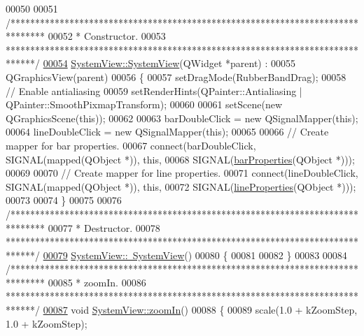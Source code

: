 \begin{DoxyCode}
00050 
00051 \textcolor{comment}{/*******************************************************************************}
00052 \textcolor{comment}{ * Constructor.}
00053 \textcolor{comment}{ ******************************************************************************/}
\hypertarget{systemview_8cpp_source_l00054}{}\hyperlink{group___graphics_ga660a455ff7b98cb92410b0bf1cbb2eeb}{00054} \hyperlink{group___graphics_ga660a455ff7b98cb92410b0bf1cbb2eeb}{SystemView::SystemView}(QWidget *parent) :
00055   QGraphicsView(parent)
00056 \{
00057   setDragMode(RubberBandDrag);
00058   \textcolor{comment}{// Enable antialiasing}
00059   setRenderHints(QPainter::Antialiasing | QPainter::SmoothPixmapTransform);
00060 
00061   setScene(\textcolor{keyword}{new} QGraphicsScene(\textcolor{keyword}{this}));
00062 
00063   barDoubleClick = \textcolor{keyword}{new} QSignalMapper(\textcolor{keyword}{this});
00064   lineDoubleClick = \textcolor{keyword}{new} QSignalMapper(\textcolor{keyword}{this});
00065 
00066   \textcolor{comment}{// Create mapper for bar properties.}
00067   connect(barDoubleClick, SIGNAL(mapped(QObject *)), \textcolor{keyword}{this},
00068           SIGNAL(\hyperlink{class_system_view_a90bd4b070c8abaa5995899154421eb44}{barProperties}(QObject *)));
00069 
00070   \textcolor{comment}{// Create mapper for line properties.}
00071   connect(lineDoubleClick, SIGNAL(mapped(QObject *)), \textcolor{keyword}{this},
00072           SIGNAL(\hyperlink{class_system_view_a58c4a0bf68178ab59066819118214360}{lineProperties}(QObject *)));
00073 
00074 \}
00075 
00076 \textcolor{comment}{/*******************************************************************************}
00077 \textcolor{comment}{ * Destructor.}
00078 \textcolor{comment}{ ******************************************************************************/}
\hypertarget{systemview_8cpp_source_l00079}{}\hyperlink{group___graphics_ga0091352981c1efa5498819b69698db44}{00079} \hyperlink{group___graphics_ga0091352981c1efa5498819b69698db44}{SystemView::~SystemView}()
00080 \{
00081 
00082 \}
00083 
00084 \textcolor{comment}{/*******************************************************************************}
00085 \textcolor{comment}{ * zoomIn.}
00086 \textcolor{comment}{ ******************************************************************************/}
\hypertarget{systemview_8cpp_source_l00087}{}\hyperlink{group___graphics_ga93170319ee5fbf9098353b383fc8a368}{00087} \textcolor{keywordtype}{void} \hyperlink{group___graphics_ga93170319ee5fbf9098353b383fc8a368}{SystemView::zoomIn}()
00088 \{
00089   scale(1.0 + kZoomStep, 1.0 + kZoomStep);

\end{DoxyCode}
